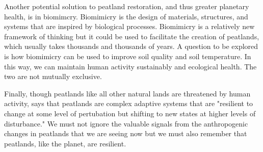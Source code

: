 Another potential solution to peatland restoration, and thus greater planetary health, is in biomimcry. Biomimicry is the design of materials, structures, and systems that are inspired by biological processes. Biomimicry is a relatively new framework of thinking but it could be used to facilitate the creation of peatlands, which usually takes thousands and thousands of years. A question to be explored is how biomimicry can be used to improve soil quality and soil temperature. In this way, we can maintain human activity sustainably and ecological health. The two are not mutually exclusive.  

Finally, though peatlands like all other natural lands are threatened by human activity, \citet{dise2009peatland} says that peatlands are complex adaptive systems that are "resilient to change at some level of pertubation but shifting to new states at higher levels of disturbance." We must not ignore the valuable signals from the anthropogenic changes in peatlands that we are seeing now but we must also remember that peatlands, like the planet, are resilient.  

